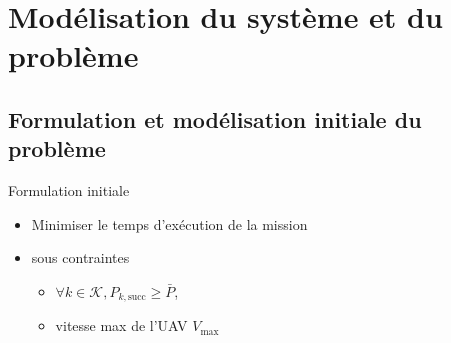 \section{Modélisation du système et du problème}

\subsection[Modèle initial]{Formulation et modélisation initiale du problème}
\begin{frame}{Formulation initiale}
  \begin{itemize}
  \item Minimiser le temps d'exécution de la mission
  \item sous contraintes
    \begin{itemize}
    \item \( \forall k \in \mathcal{K}, P_{k, \text{succ}} \geq
      \bar{P} \),
    \item vitesse max de l'UAV \( V_{\text{max}} \)
    \end{itemize}
  \end{itemize}
      
\end{frame}



